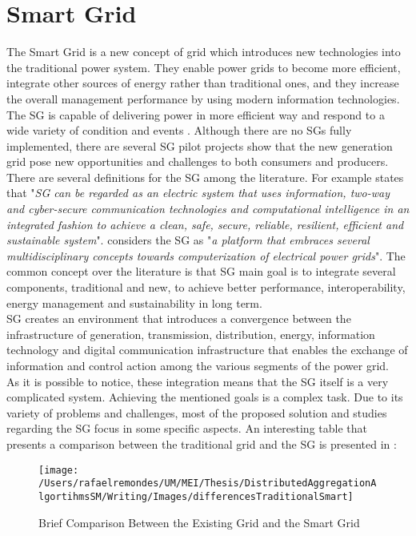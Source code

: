 \chapter{Smart Grid}\label{chap:sg}
The Smart Grid  is a new concept of grid which introduces new technologies into the traditional power system. They enable power grids to become more efficient, integrate other sources of energy rather than traditional ones, and  they increase the overall management performance by using modern information technologies. The SG is capable of delivering power in more efficient way and respond to a wide variety of condition and events \cite{journals/comsur/FangMXY12}. Although there are no SGs fully implemented, there are several SG pilot projects  show that the new generation grid pose new opportunities and challenges to both consumers and producers. \\
There are several definitions for the SG among the literature. For example \cite{journals/comsur/FangMXY12} states that  "\textit{SG can be regarded as an electric system that uses information, two-way and cyber-secure communication technologies and computational intelligence in an integrated fashion to achieve a clean, safe, secure, reliable, resilient, efficient and sustainable system}".\cite{conf/isgt/GhoshPR13} considers the SG as "\textit{a platform that embraces several multidisciplinary concepts towards computerization of electrical power grids}". The common concept over the literature is that SG main goal is to integrate several components, traditional and new, to achieve better performance, interoperability, energy management and sustainability in long term. \\
SG creates an environment that introduces a convergence between the infrastructure of generation, transmission, distribution, energy, information technology and digital communication infrastructure that enables the exchange of information and control action among the various segments of the power grid.\\
As it is possible to notice, these integration means that the SG itself is a very complicated system. Achieving the mentioned goals is a complex task. Due to its variety of problems and challenges, most of the proposed solution and studies regarding the SG focus in some specific aspects. 
An interesting table that presents a comparison between the traditional grid and the SG is presented in \cite{journals/comsur/FangMXY12}:
\begin{figure}[h]
\centering
\texttt{[image: /Users/rafaelremondes/UM/MEI/Thesis/DistributedAggregationAlgortihmsSM/Writing/Images/differencesTraditionalSmart]}
\caption{\label{fig:comparisonOldNew} Brief Comparison Between the Existing Grid and the Smart Grid}
\end{figure}

